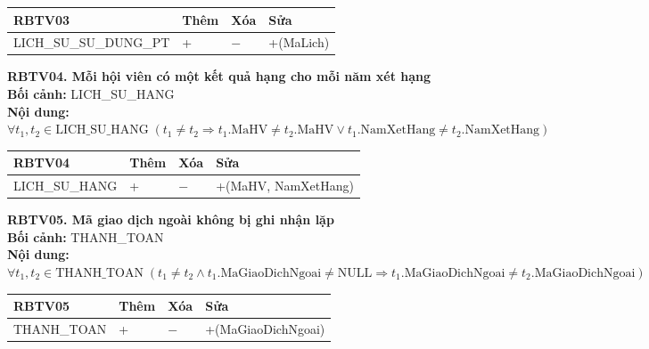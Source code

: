 \documentclass[11pt, a4paper]{article}
\begin{document}
\vspace{0.3em}
\begin{small}
\begin{tabularx}{\textwidth}{| C{4.2cm} | C{2cm} | C{2cm} | Y |}
\hline
\textbf{RBTV03} & \textbf{Thêm} & \textbf{Xóa} & \textbf{Sửa} \\
\hline
LICH\_SU\_SU\_DUNG\_PT & + & $-$ & +(MaLich) \\
\hline
\end{tabularx}
\end{small}

\vspace{0.8em}
\textbf{RBTV04. Mỗi hội viên có một kết quả hạng cho mỗi năm xét hạng} \\
\textbf{Bối cảnh:} LICH\_SU\_HANG \\
\textbf{Nội dung:} $\forall t_1, t_2 \in \text{LICH\_SU\_HANG} \; (t_1 \neq t_2 \Rightarrow t_1.\text{MaHV} \neq t_2.\text{MaHV} \lor t_1.\text{NamXetHang} \neq t_2.\text{NamXetHang})$

\vspace{0.3em}
\begin{small}
\begin{tabularx}{\textwidth}{| C{4.2cm} | C{2cm} | C{2cm} | Y |}
\hline
\textbf{RBTV04} & \textbf{Thêm} & \textbf{Xóa} & \textbf{Sửa} \\
\hline
LICH\_SU\_HANG & + & $-$ & +(MaHV, NamXetHang) \\
\hline
\end{tabularx}
\end{small}

\vspace{0.8em}
\textbf{RBTV05. Mã giao dịch ngoài không bị ghi nhận lặp} \\
\textbf{Bối cảnh:} THANH\_TOAN \\
\textbf{Nội dung:} $\forall t_1, t_2 \in \text{THANH\_TOAN} \; (t_1 \neq t_2 \land t_1.\text{MaGiaoDichNgoai} \neq \text{NULL} \Rightarrow t_1.\text{MaGiaoDichNgoai} \neq t_2.\text{MaGiaoDichNgoai})$

\vspace{0.3em}
\begin{small}
\begin{tabularx}{\textwidth}{| C{4.2cm} | C{2cm} | C{2cm} | Y |}
\hline
\textbf{RBTV05} & \textbf{Thêm} & \textbf{Xóa} & \textbf{Sửa} \\
\hline
THANH\_TOAN & + & $-$ & +(MaGiaoDichNgoai) \\
\hline
\end{tabularx}
\end{small}
\end{document}
